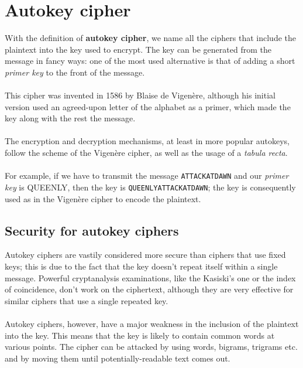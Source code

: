 \documentclass[Lau,binding=0.6cm,oneside]{sapthesis}
\begin{document}
\section{Autokey cipher}
With the definition of \textbf{autokey cipher}, we name all the ciphers that include the plaintext into the key used to encrypt. The key can be generated from the message in fancy ways: one of the most used alternative is that of adding a short \textit{primer key} to the front of the message.\\\\
This cipher was invented in 1586 by Blaise de Vigenère, although his initial version used an agreed-upon letter of the alphabet as a primer, which made the key along with the rest the message.\\\\
The encryption and decryption mechanisms, at least in more popular autokeys, follow the scheme of the Vigenère cipher, as well as the usage of a \textit{tabula recta}.\\\\
For example, if we have to transmit the message \colorbox{gray!12}{\small{\texttt{ATTACKATDAWN}}} and our \textit{primer key} is \textsf{QUEENLY}, then the key is \colorbox{gray!12}{\small{\texttt{QUEENLYATTACKATDAWN}}}; the key is consequently used as in the Vigenère cipher to encode the plaintext.

\subsection{Security for autokey ciphers}
Autokey ciphers are vastily considered more secure than ciphers that use fixed keys; this is due to the fact that the key doesn't repeat itself within a single message. Powerful cryptanalysis examinations, like the Kasiski's one or the index of coincidence, don't work on the ciphertext\supercite{autokey}, although they are very effective for similar ciphers that use a single repeated key.\\\\
Autokey ciphers, however, have a major weakness in the inclusion of the plaintext into the key. This means that the key is likely to contain common words at various points. The cipher can be attacked by using words, bigrams, trigrams etc. and by moving them until potentially-readable text comes out.\\
\end{document}
